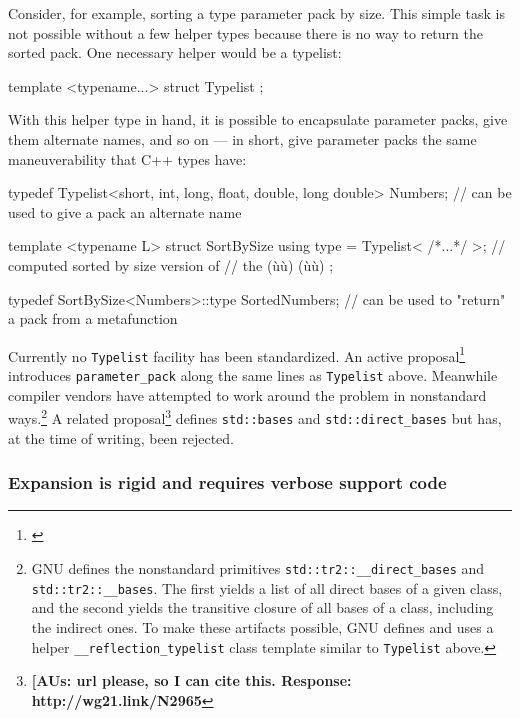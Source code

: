 Consider, for example, sorting a type parameter pack by size. This
simple task is not possible without a few helper types because there is
no way to return the sorted pack. One necessary helper would be a
typelist:

\begin{emcppslisting}[emcppsbatch=e43]
template <typename...> struct Typelist { };
\end{emcppslisting}
    

\noindent With this helper type in hand, it is possible to encapsulate parameter
packs, give them alternate names, and so on --- in short, give parameter
packs the same maneuverability that C++ types have:

\begin{emcppslisting}[emcppsbatch=e43]
typedef Typelist<short, int, long, float, double, long double> Numbers;
    // can be used to give a pack an alternate name

template <typename L>
struct SortBySize
{
    using type = Typelist< /*...*/ >;  // computed sorted by size version of
                                       // the (ù{}ù) (ù{}ù) 
};

typedef SortBySize<Numbers>::type SortedNumbers;
    // can be used to "return" a pack from a metafunction
\end{emcppslisting}
    

\noindent Currently no \lstinline!Typelist! facility has been standardized. An active
proposal{\cprotect\footnote{\cite{spertus13}}}
introduces \lstinline!parameter_pack! along the same lines as
\lstinline!Typelist! above. Meanwhile compiler vendors have attempted to
work around the problem in nonstandard ways.{\cprotect\footnote{GNU
defines the nonstandard primitives
\lstinline!std::tr2::__direct_bases! and \lstinline!std::tr2::__bases!.
The first yields a list of all direct bases of a given class, and the
second yields the transitive closure of all bases of a class,
including the indirect ones. To make these artifacts possible, GNU
defines and uses a helper \lstinline!__reflection_typelist! class
  template similar to \lstinline!Typelist! above.}} A related
proposal{\cprotect\footnote{\textbf{[AUs: url please, so I can cite this.  Response: http://wg21.link/N2965}}} defines
\lstinline!std::bases! and \lstinline!std::direct_bases! but has, at the time
of writing, been rejected.

\subsubsection[Expansion is rigid and requires verbose support code]{Expansion is rigid and requires verbose support code}\label{expansion-is-rigid-and-requires-verbose-support-code}

